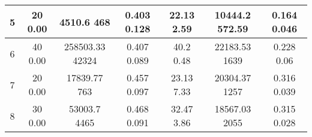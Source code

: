 \begin{table}[h]
{\begin{tabular}{|c|c|c|c|c|c|c|}
5                & 20 \rlap{{$\pm$}}\hspace{0.4cm} 0.00             & 4510.6 \rlap{{$\pm$}}\hspace{0.4cm}468 \rlap{{$\downarrow$}}           & 0.403 \rlap{{$\pm$}}\hspace{0.4cm}0.128\rlap{{$\uparrow$}}        & 22.13 \rlap{{$\pm$}}\hspace{0.4cm}2.59      & 10444.2 \rlap{{$\pm$}}\hspace{0.4cm}572.59     & 0.164 \rlap{{$\pm$}}\hspace{0.4cm}0.046            \\ \hline
6                & 40 \rlap{{$\pm$}}\hspace{0.4cm} 0.00              & 258503.33 \rlap{{$\pm$}}\hspace{0.4cm}42324      & 0.407 \rlap{{$\pm$}}\hspace{0.4cm}0.089 \rlap{{$\uparrow$}}       & 40.2 \rlap{{$\pm$}}\hspace{0.4cm}0.48       & 22183.53 \rlap{{$\pm$}}\hspace{0.4cm}1639      & 0.228 \rlap{{$\pm$}}\hspace{0.4cm}0.06           \\ \hline
7                & 20 \rlap{{$\pm$}}\hspace{0.4cm} 0.00              & 17839.77 \rlap{{$\pm$}}\hspace{0.4cm}763 \rlap{{$\downarrow$}}          & 0.457 \rlap{{$\pm$}}\hspace{0.4cm}0.097 \rlap{{$\uparrow$}}       & 23.13 \rlap{{$\pm$}}\hspace{0.4cm}7.33      & 20304.37 \rlap{{$\pm$}}\hspace{0.4cm}1257      & 0.316 \rlap{{$\pm$}}\hspace{0.4cm}0.039          \\ \hline
8                & 30 \rlap{{$\pm$}}\hspace{0.4cm} 0.00              & 53003.7 \rlap{{$\pm$}}\hspace{0.4cm}4465         & 0.468 \rlap{{$\pm$}}\hspace{0.4cm}0.091 \rlap{{$\uparrow$}}       & 32.47 \rlap{{$\pm$}}\hspace{0.4cm}3.86      & 18567.03 \rlap{{$\pm$}}\hspace{0.4cm}2055      & 0.315 \rlap{{$\pm$}}\hspace{0.4cm}0.028                \\ \hline
\end{tabular}
}
\end{table}

